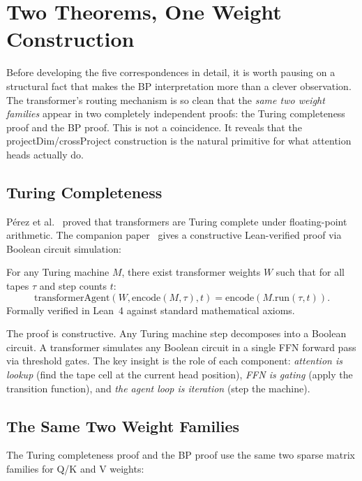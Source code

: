 \section{Two Theorems, One Weight Construction}
\label{sec:turing-complete}

Before developing the five correspondences in detail, it is worth pausing on a
structural fact that makes the BP interpretation more than a clever observation.
The transformer's routing mechanism is so clean that the \emph{same two weight
families} appear in two completely independent proofs: the Turing completeness
proof and the BP proof. This is not a coincidence. It reveals that the
projectDim/crossProject construction is the natural primitive for what attention
heads actually do.

\subsection*{Turing Completeness}

P\'{e}rez et al.~\cite{perez2021turing} proved that transformers are Turing
complete under floating-point arithmetic. The companion
paper~\cite{coppola2026transformers} gives a constructive Lean-verified proof
via Boolean circuit simulation:

\begin{theorem}
For any Turing machine $M$, there exist transformer weights $W$ such that for
all tapes $\tau$ and step counts $t$:
\[
\mathrm{transformerAgent}(W, \mathrm{encode}(M, \tau), t)
= \mathrm{encode}(M.\mathrm{run}(\tau, t)).
\]
Formally verified in Lean~4 against standard mathematical axioms.
\end{theorem}

The proof is constructive. Any Turing machine step decomposes into a Boolean
circuit. A transformer simulates any Boolean circuit in a single FFN forward
pass via threshold gates. The key insight is the role of each component:
\emph{attention is lookup} (find the tape cell at the current head position),
\emph{FFN is gating} (apply the transition function), and \emph{the agent loop
is iteration} (step the machine).

\subsection*{The Same Two Weight Families}

The Turing completeness proof and the BP proof use the same two sparse matrix
families for Q/K and V weights:

